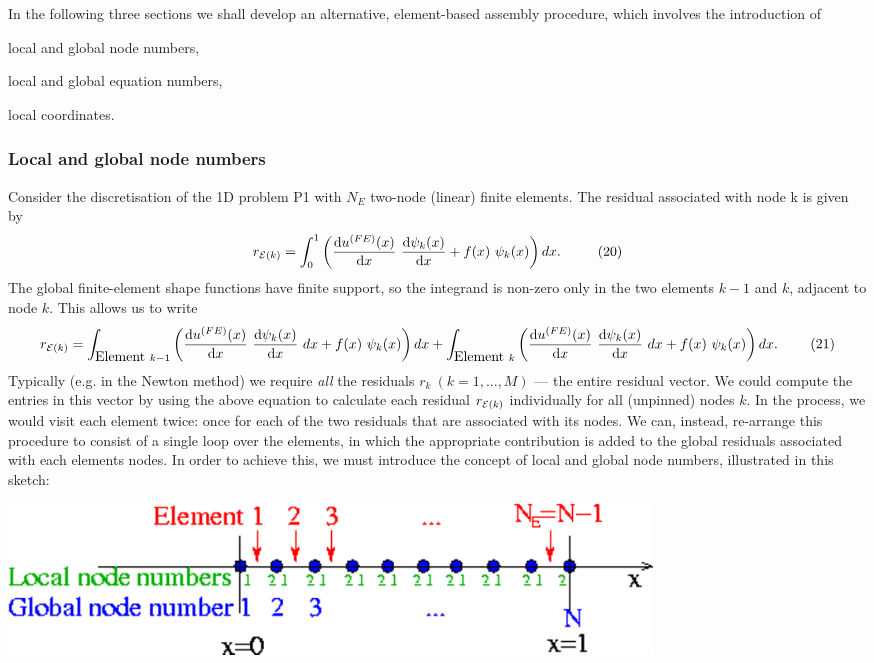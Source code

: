 In the following three sections we shall develop an alternative, element-\/based assembly procedure, which involves the introduction of
\begin{DoxyItemize}
\item local and global node numbers,
\item local and global equation numbers,
\item local coordinates.
\end{DoxyItemize}\hypertarget{index_local_global_nodes}{}\subsubsection{Local and global node numbers}\label{index_local_global_nodes}
Consider the discretisation of the 1D problem P1 with $N_E$ two-\/node (linear) finite elements. The residual associated with node k is given by \[ r_{{\cal E}(k)} = \int_0^1 \left( \frac{\mbox{d} u^{(FE)}(x)}{\mbox{d} x} \ \frac{\mbox{d} \psi_k(x)}{\mbox{d} x} + f(x) \ \psi_k(x) \right) dx. \ \ \ \ \ \ \ \ (20) \] The global finite-\/element shape functions have finite support, so the integrand is non-\/zero only in the two elements $k-1$ and $k$, adjacent to node $k$. This allows us to write \[ r_{{\cal E}(k)} = \int_{\mbox{Element }k-1} \left( \frac{\mbox{d} u^{(FE)}(x)}{\mbox{d} x} \ \frac{\mbox{d} \psi_k(x)}{\mbox{d} x} \ dx + f(x) \ \psi_k(x) \right) dx + \int_{\mbox{Element }k} \left( \frac{\mbox{d} u^{(FE)}(x)}{\mbox{d} x} \ \frac{\mbox{d} \psi_k(x)}{\mbox{d} x} \ dx + f(x) \ \psi_k(x) \right) dx. \ \ \ \ \ \ \ (21) \] Typically (e.\+g. in the Newton method) we require {\itshape all} the residuals $ r_k \ (k=1,...,M) $ --- the entire residual vector. We could compute the entries in this vector by using the above equation to calculate each residual $ r_{{\cal E}(k)}$ individually for all (unpinned) nodes $k$. In the process, we would visit each element twice\+: once for each of the two residuals that are associated with its nodes. We can, instead, re-\/arrange this procedure to consist of a single loop over the elements, in which the appropriate contribution is added to the global residuals associated with each element\textquotesingle{}s nodes. In order to achieve this, we must introduce the concept of local and global node numbers, illustrated in this sketch\+:  
\begin{DoxyImage}
\includegraphics[width=0.75\textwidth]{1Dmesh_local_and_global_node_numbers}
\end{DoxyImage}
